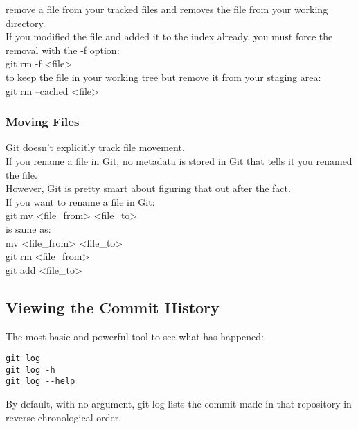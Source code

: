 \documentclass[11pt]{article}
\begin{document}
remove a file from your tracked files and removes the file from your working directory.\\

If you modified the file and added it to the index already, you must force the removal with the -f option:\\
git rm -f <file>\\

to keep the file in your working tree but remove it from your staging area:\\
git rm --cached <file>\\


\subsubsection{Moving Files}
\label{sec:org52c3fe1}
Git doesn't explicitly track file movement.\\
If you rename a file in Git, no metadata is stored in Git that tells it you renamed the file.\\
However, Git is pretty smart about figuring that out after the fact.\\

If you want to rename a file in Git:\\
git mv <file\_from> <file\_to>\\

is same as:\\
mv <file\_from> <file\_to>\\
git rm <file\_from>\\
git add <file\_to>\\


\subsection{Viewing the Commit History}
\label{sec:orgd647cac}
The most basic and powerful tool to see what has happened:\\
\begin{verbatim}
git log
git log -h
git log --help
\end{verbatim}

By default, with no argument, git log lists the commit made in that repository in reverse chronological order.\\
\end{document}
